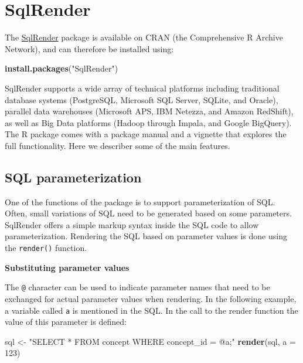 \documentclass[11pt]{book}
\newenvironment{Shaded}{\begin{snugshade}}{\end{snugshade}}
\newcommand{\DataTypeTok}[1]{\textcolor[rgb]{0.13,0.29,0.53}{#1}}
\newcommand{\DecValTok}[1]{\textcolor[rgb]{0.00,0.00,0.81}{#1}}
\newcommand{\KeywordTok}[1]{\textcolor[rgb]{0.13,0.29,0.53}{\textbf{#1}}}
\newcommand{\NormalTok}[1]{#1}
\newcommand{\StringTok}[1]{\textcolor[rgb]{0.31,0.60,0.02}{#1}}
\theoremstyle{definition}
\theoremstyle{definition}
\theoremstyle{definition}
\theoremstyle{remark}
\begin{document}
\hypertarget{SqlRender}{%
\section{SqlRender}\label{SqlRender}}

The \href{https://ohdsi.github.io/SqlRender/}{SqlRender} package is available on CRAN (the Comprehensive R Archive Network), and can therefore be installed using:

\begin{Shaded}
\begin{Highlighting}[]
\KeywordTok{install.packages}\NormalTok{(}\StringTok{"SqlRender"}\NormalTok{)}
\end{Highlighting}
\end{Shaded}

SqlRender supports a wide array of technical platforms including traditional database systems (PostgreSQL, Microsoft SQL Server, SQLite, and Oracle), parallel data warehouses (Microsoft APS, IBM Netezza, and Amazon RedShift), as well as Big Data platforms (Hadoop through Impala, and Google BigQuery). The R package comes with a package manual and a vignette that explores the full functionality. Here we describer some of the main features.

\hypertarget{sql-parameterization}{%
\subsection{SQL parameterization}\label{sql-parameterization}}

One of the functions of the package is to support parameterization of SQL. Often, small variations of SQL need to be generated based on some parameters. SqlRender offers a simple markup syntax inside the SQL code to allow parameterization. Rendering the SQL based on parameter values is done using the \texttt{render()} function.

\textbf{Substituting parameter values}

The \texttt{@} character can be used to indicate parameter names that need to be exchanged for actual parameter values when rendering. In the following example, a variable called \texttt{a} is mentioned in the SQL. In the call to the render function the value of this parameter is defined:

\begin{Shaded}
\begin{Highlighting}[]
\NormalTok{sql <-}\StringTok{ "SELECT * FROM concept WHERE concept_id = @a;"}
\KeywordTok{render}\NormalTok{(sql, }\DataTypeTok{a =} \DecValTok{123}\NormalTok{)}
\end{Highlighting}
\end{Shaded}
\end{document}
